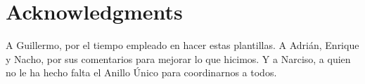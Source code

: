 
\chapter*{Acknowledgments}

A Guillermo, por el tiempo empleado en hacer estas plantillas. A Adrián, Enrique y Nacho, por sus comentarios para mejorar lo que hicimos. Y a Narciso, a quien no le ha hecho falta el Anillo Único para coordinarnos a todos.











